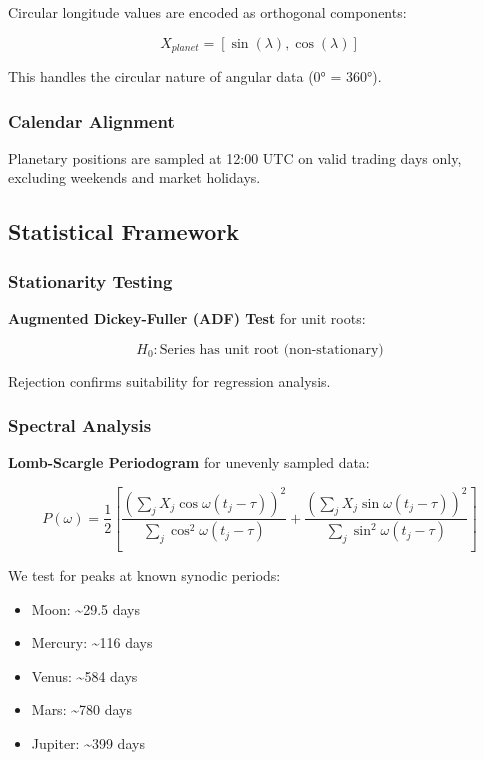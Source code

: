 \documentclass[
  11pt,
  a4paper,
  oneside,
  openany]{article}
\providecommand{\tightlist}{%
  \setlength{\itemsep}{0pt}\setlength{\parskip}{0pt}}\usepackage{longtable,booktabs,array}
\begin{document}
Circular longitude values are encoded as orthogonal components:

\[
X_{planet} = [\sin(\lambda), \cos(\lambda)]
\]

This handles the circular nature of angular data (0° = 360°).

\subsubsection{Calendar Alignment}\label{calendar-alignment}

Planetary positions are sampled at 12:00 UTC on valid trading days only,
excluding weekends and market holidays.

\subsection{Statistical Framework}\label{statistical-framework}

\subsubsection{Stationarity Testing}\label{stationarity-testing}

\textbf{Augmented Dickey-Fuller (ADF) Test} for unit roots:

\[
H_0: \text{Series has unit root (non-stationary)}
\]

Rejection confirms suitability for regression analysis.

\subsubsection{Spectral Analysis}\label{spectral-analysis}

\textbf{Lomb-Scargle Periodogram} for unevenly sampled data:

\[
P(\omega) = \frac{1}{2}\left[\frac{(\sum_j X_j \cos\omega(t_j-\tau))^2}{\sum_j \cos^2\omega(t_j-\tau)} + \frac{(\sum_j X_j \sin\omega(t_j-\tau))^2}{\sum_j \sin^2\omega(t_j-\tau)}\right]
\]

We test for peaks at known synodic periods:

\begin{itemize}
\tightlist
\item
  Moon: \textasciitilde29.5 days
\item
  Mercury: \textasciitilde116 days
\item
  Venus: \textasciitilde584 days
\item
  Mars: \textasciitilde780 days
\item
  Jupiter: \textasciitilde399 days
\end{itemize}
\end{document}
